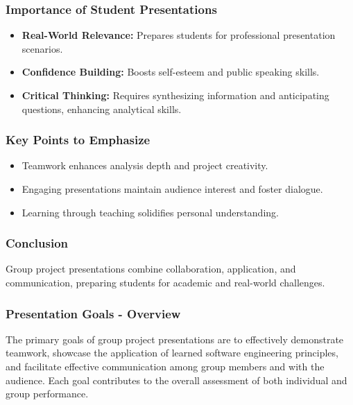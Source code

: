 \documentclass{beamer}
\begin{document}
\begin{frame}[fragile]
    \frametitle{Importance of Student Presentations}
    \begin{itemize}
        \item \textbf{Real-World Relevance:} Prepares students for professional presentation scenarios.
        \item \textbf{Confidence Building:} Boosts self-esteem and public speaking skills.
        \item \textbf{Critical Thinking:} Requires synthesizing information and anticipating questions, enhancing analytical skills.
    \end{itemize}
\end{frame}

\begin{frame}[fragile]
    \frametitle{Key Points to Emphasize}
    \begin{itemize}
        \item Teamwork enhances analysis depth and project creativity.
        \item Engaging presentations maintain audience interest and foster dialogue.
        \item Learning through teaching solidifies personal understanding.
    \end{itemize}
\end{frame}

\begin{frame}[fragile]
    \frametitle{Conclusion}
    Group project presentations combine collaboration, application, and communication, preparing students for academic and real-world challenges.
\end{frame}

\begin{frame}[fragile]
    \frametitle{Presentation Goals - Overview}
    The primary goals of group project presentations are to effectively demonstrate teamwork, showcase the application of learned software engineering principles, and facilitate effective communication among group members and with the audience. Each goal contributes to the overall assessment of both individual and group performance.
\end{frame}
\end{document}
